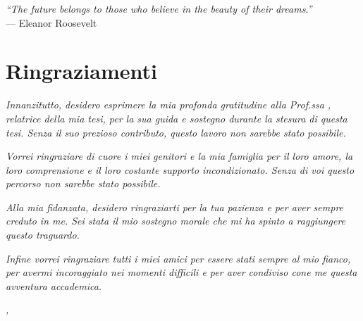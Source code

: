 \cleardoublepage{}

\begin{flushright}{
    \slshape
    ``The future belongs to those who believe in the beauty of their dreams.''} \\
    \medskip
    --- Eleanor Roosevelt
\end{flushright}


\bigskip

\begingroup
\let\clearpage\relax
\let\cleardoublepage\relax
\let\cleardoublepage\relax

\chapter*{Ringraziamenti}

\noindent \textit{Innanzitutto, desidero esprimere la mia profonda gratitudine alla Prof.ssa \myProf, relatrice della mia tesi, per la sua guida e sostegno durante la stesura di questa tesi. Senza il suo prezioso contributo, questo lavoro non sarebbe stato possibile.\\}

\noindent \textit{Vorrei ringraziare di cuore i miei genitori e la mia famiglia per il loro amore, la loro comprensione e il loro costante supporto incondizionato. Senza di voi questo percorso non sarebbe stato possibile.\\}

\noindent \textit{Alla mia fidanzata, desidero ringraziarti per la tua pazienza e per aver sempre creduto in me. Sei stata il mio sostegno morale che mi ha spinto a raggiungere questo traguardo. \\}

\noindent \textit{Infine vorrei ringraziare tutti i miei amici per essere stati sempre al mio fianco, per avermi incoraggiato nei momenti difficili e per aver condiviso cone me questa avventura accademica.\\}



\bigskip

\noindent\textit{\myLocation, \myTime}
\hfill \myName\endgroup
